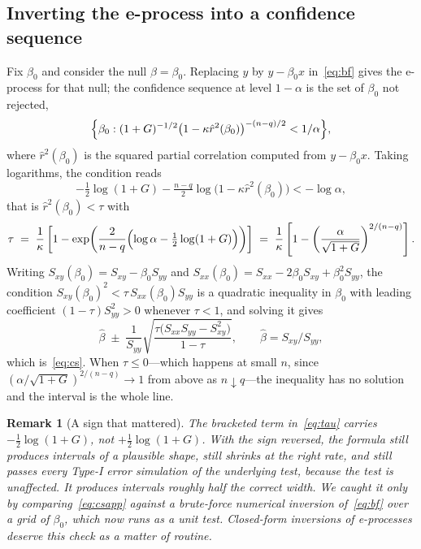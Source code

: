 \documentclass[pdflatex,sn-apa]{sn-jnl}
\theoremstyle{thmstyleone}%
\theoremstyle{thmstyletwo}%
\newtheorem{remark}{Remark}%
\theoremstyle{thmstylethree}%
\begin{document}
\begin{appendices}
\section{Inverting the e-process into a confidence sequence}\label{app:cs}

Fix $\beta_0$ and consider the null $\beta = \beta_0$. Replacing $y$ by
$y - \beta_0 x$ in~\eqref{eq:bf} gives the e-process for that null; the
confidence sequence at level $1-\alpha$ is the set of $\beta_0$ not rejected,
\begin{equation*}
\Bigl\{ \beta_0 :
  (1+G)^{-1/2}\bigl(1 - \kappa \hat r^2(\beta_0)\bigr)^{-(n-q)/2}
  < 1/\alpha \Bigr\},
\end{equation*}
where $\hat r^2(\beta_0)$ is the squared partial correlation computed from
$y - \beta_0 x$. Taking logarithms, the condition reads
\begin{equation*}
-\tfrac12 \log(1+G) - \tfrac{n-q}{2}\log\bigl(1 - \kappa\hat r^2(\beta_0)\bigr)
  < -\log\alpha ,
\end{equation*}
that is $\hat r^2(\beta_0) < \tau$ with
\begin{equation}\label{eq:tau}
\tau \;=\; \frac{1}{\kappa}
  \left[ 1 - \exp\!\left( \frac{2}{n-q}
    \Bigl( \log\alpha - \tfrac12\log(1+G) \Bigr) \right) \right]
\;=\; \frac{1}{\kappa}
  \left[ 1 - \left(\frac{\alpha}{\sqrt{1+G}}\right)^{2/(n-q)} \right].
\end{equation}
Writing $S_{xy}(\beta_0) = S_{xy} - \beta_0 S_{yy}$ and
$S_{xx}(\beta_0) = S_{xx} - 2\beta_0 S_{xy} + \beta_0^2 S_{yy}$, the condition
$S_{xy}(\beta_0)^2 < \tau\, S_{xx}(\beta_0) S_{yy}$ is a quadratic inequality
in $\beta_0$ with leading coefficient $(1-\tau)S_{yy}^2 > 0$ whenever
$\tau < 1$, and solving it gives
\begin{equation}\label{eq:csapp}
\hat\beta \;\pm\; \frac{1}{S_{yy}}
  \sqrt{\frac{\tau\bigl(S_{xx}S_{yy} - S_{xy}^2\bigr)}{1-\tau}},
\qquad \hat\beta = S_{xy}/S_{yy},
\end{equation}
which is~\eqref{eq:cs}. When $\tau \le 0$---which happens at small $n$, since
$(\alpha/\sqrt{1+G})^{2/(n-q)} \to 1$ from above as $n \downarrow q$---the
inequality has no solution and the interval is the whole line.

\begin{remark}[A sign that mattered]
The bracketed term in~\eqref{eq:tau} carries $-\tfrac12\log(1+G)$, not
$+\tfrac12\log(1+G)$. With the sign reversed, the formula still produces
intervals of a plausible shape, still shrinks at the right rate, and still
passes every Type-I error simulation of the underlying \emph{test}, because
the test is unaffected. It produces intervals roughly half the correct width.
We caught it only by comparing~\eqref{eq:csapp} against a brute-force
numerical inversion of~\eqref{eq:bf} over a grid of $\beta_0$, which now runs
as a unit test. Closed-form inversions of e-processes deserve this check as a
matter of routine.
\end{remark}


\end{appendices}
\end{document}
